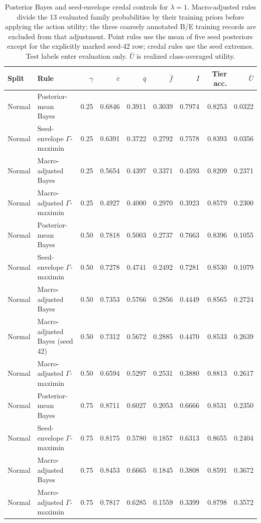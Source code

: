 \begin{table}[htbp]
\centering\scriptsize
\setlength{\tabcolsep}{2.8pt}
\caption{Posterior Bayes and seed-envelope credal controls for $\lambda=1$. Macro-adjusted rules divide the 13 evaluated family probabilities by their training priors before applying the action utility; the three coarsely annotated B/E training records are excluded from that adjustment. Point rules use the mean of five seed posteriors except for the explicitly marked seed-42 row; credal rules use the seed extremes. Test labels enter evaluation only. $\bar U$ is realized class-averaged utility.}
\label{tab:supp-bayes-credal}
\begin{tabular}{llrrrrrrr}
\toprule
Split & Rule & $\gamma$ & $\bar c$ & $\bar q$ & $\bar f$ & $I$ & Tier acc. & $\bar U$ \\
\midrule
Normal & Posterior-mean Bayes & 0.25 & 0.6846 & 0.3911 & 0.3039 & 0.7974 & 0.8253 & 0.0322 \\
Normal & Seed-envelope $\Gamma$-maximin & 0.25 & 0.6391 & 0.3722 & 0.2792 & 0.7578 & 0.8393 & 0.0356 \\
Normal & Macro-adjusted Bayes & 0.25 & 0.5654 & 0.4397 & 0.3371 & 0.4593 & 0.8209 & 0.2371 \\
Normal & Macro-adjusted $\Gamma$-maximin & 0.25 & 0.4927 & 0.4000 & 0.2970 & 0.3923 & 0.8579 & 0.2300 \\
Normal & Posterior-mean Bayes & 0.50 & 0.7818 & 0.5003 & 0.2737 & 0.7663 & 0.8396 & 0.1055 \\
Normal & Seed-envelope $\Gamma$-maximin & 0.50 & 0.7278 & 0.4741 & 0.2492 & 0.7281 & 0.8530 & 0.1079 \\
Normal & Macro-adjusted Bayes & 0.50 & 0.7353 & 0.5766 & 0.2856 & 0.4449 & 0.8565 & 0.2724 \\
Normal & Macro-adjusted Bayes (seed 42) & 0.50 & 0.7312 & 0.5672 & 0.2885 & 0.4470 & 0.8533 & 0.2639 \\
Normal & Macro-adjusted $\Gamma$-maximin & 0.50 & 0.6594 & 0.5297 & 0.2531 & 0.3880 & 0.8813 & 0.2617 \\
Normal & Posterior-mean Bayes & 0.75 & 0.8711 & 0.6027 & 0.2053 & 0.6666 & 0.8531 & 0.2350 \\
Normal & Seed-envelope $\Gamma$-maximin & 0.75 & 0.8175 & 0.5780 & 0.1857 & 0.6313 & 0.8655 & 0.2404 \\
Normal & Macro-adjusted Bayes & 0.75 & 0.8453 & 0.6665 & 0.1845 & 0.3808 & 0.8591 & 0.3672 \\
Normal & Macro-adjusted $\Gamma$-maximin & 0.75 & 0.7817 & 0.6285 & 0.1559 & 0.3399 & 0.8798 & 0.3572 \\

\end{tabular}
\end{table}
